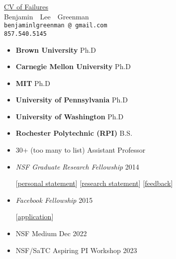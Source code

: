 \documentclass{article}
\makeatletter
\renewcommand{\maketitle}{
\begin{center}
  {\large{\href{https://www.princeton.edu/~joha/Johannes\_Haushofer\_CV\_of\_Failures.pdf}{CV of Failures}} \\
   \large{Benjamin~~Lee~~Greenman}}
\\\texttt{benjaminlgreenman\,@\,gmail.com}
\\\texttt{857.540.5145}
\end{center}
}
\makeatother
\begin{document}
\maketitle

{\centering{}}



\begin{itemize}
\item {\bf Brown University} \hfill Ph.D
\item {\bf Carnegie Mellon University} \hfill Ph.D
\item {\bf MIT} \hfill Ph.D
\item {\bf University of Pennsylvania} \hfill Ph.D
\item {\bf University of Washington} \hfill Ph.D
\item {\bf Rochester Polytechnic (RPI)} \hfill B.S.
\end{itemize}


\begin{itemize}
  \item 30+ (too many to list)  \hfill Assistant Professor
\end{itemize}


\begin{itemize}
\item \emph{NSF Graduate Research Fellowship} \hfill 2014
\item[] [\href{https://cs.brown.edu/~bgreenma/cv/failures/nsf-2014-personal-reject.pdf}{personal statement}]
        [\href{https://cs.brown.edu/~bgreenma/cv/failures/nsf-2014-research-reject.pdf}{research statement}]
        [\href{https://cs.brown.edu/~bgreenma/cv/failures/nsf-2014-reject-response.pdf}{feedback}]
\item \emph{Facebook Fellowship} \hfill 2015
\item[] [\href{http://ccs.neu.edu/home/types/cv/failures/facebook-2015-reject.pdf}{application}]
\item NSF Medium \hfill Dec 2022
\item NSF/SaTC Aspiring PI Workshop \hfill 2023
\end{itemize}
\end{document}
